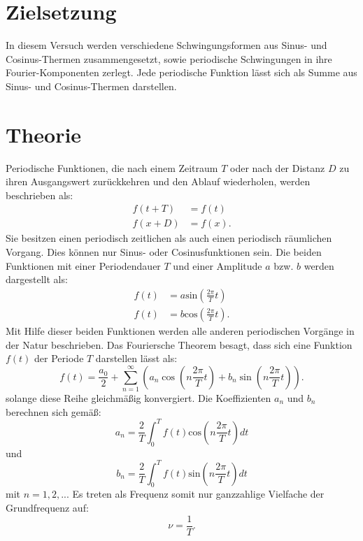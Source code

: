 \section{Zielsetzung}
\label{sec:Zielsetzung}
In diesem Versuch werden verschiedene Schwingungsformen aus Sinus- und Cosinus-Thermen zusammengesetzt, sowie periodische Schwingungen in ihre Fourier-Komponenten zerlegt. Jede periodische Funktion lässt sich als Summe aus Sinus- und Cosinus-Thermen darstellen.
\section{Theorie}
\label{sec:Theorie}
Periodische Funktionen, die nach einem Zeitraum $T$ oder nach der Distanz $D$ zu ihren Ausgangswert zurückkehren und den Ablauf wiederholen, werden beschrieben als:
\begin{align*}
f(t+T) &= f(t) \\
f(x+D) &= f(x).
\end{align*}
Sie besitzen einen periodisch zeitlichen als auch einen periodisch räumlichen Vorgang. Dies können nur Sinus- oder Cosinusfunktionen sein. Die beiden Funktionen mit einer Periodendauer $T$ und einer Amplitude $a$ bzw. $b$ werden dargestellt als:
\begin{align}
\label{algn:Funktionen}
f(t) &= a \text{sin} (\frac{2\pi }{T}t) \\
f(t) &= b \text{cos} (\frac{2 \pi }{T}t).
\end{align}
Mit Hilfe dieser beiden Funktionen werden alle anderen periodischen Vorgänge in der Natur beschrieben.
Das Fouriersche Theorem besagt, dass sich eine Funktion $f(t)$ der Periode $T$ darstellen lässt als:
\begin{equation}
\label{eqn:FourierTheorem}
f(t) = \frac{a_0}{2} + \sum_{n=1}^\infty \left(a_n \cos\left(n\frac{2\pi}{T}t\right) + b_n \sin\left(n\frac{2\pi}{T}t\right)\right).
\end{equation}
solange diese Reihe gleichmäßig konvergiert. Die Koeffizienten $a_{n}$ und $b_{n}$ berechnen sich gemäß:
\begin{equation}
a_n = \frac{2}{T} \int_{0}^{T} f(t) \text{cos}\left(n \frac{2 \pi}{T} t \right) dt 
\end{equation}
und
\begin{equation}
b_n = \frac{2}{T} \int_{0}^{T} f(t) \text{sin}\left(n \frac{2 \pi}{T} t \right) dt 
\end{equation}
mit $n = 1,2,...$
Es treten als Frequenz somit nur ganzzahlige Vielfache der Grundfrequenz auf:
\begin{equation*}
\nu = \frac{1}{T}.
\end{equation*}
